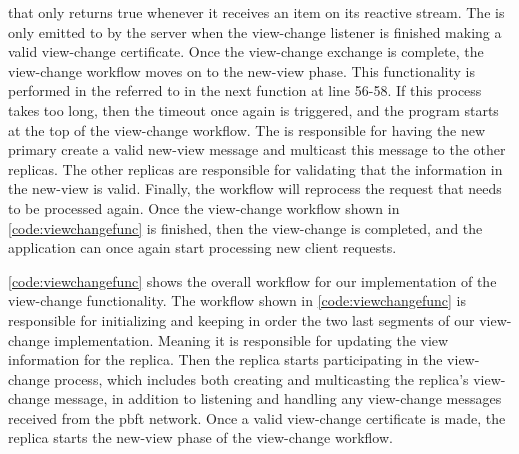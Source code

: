  that only returns true whenever it receives an item on its reactive stream. The  is only emitted to by the server when the view-change listener is finished making a valid view-change certificate. Once the view-change exchange is complete, the view-change workflow moves on to the new-view phase. This functionality is performed in the  referred to in the next  function at line 56-58. If this process takes too long, then the timeout once again is triggered, and the program starts at the top of the view-change workflow. The  is responsible for having the new primary create a valid new-view message and multicast this message to the other replicas. The other replicas are responsible for validating that the information in the new-view is valid. Finally, the workflow will reprocess the request that needs to be processed again. Once the view-change workflow shown in \autoref{code:viewchangefunc} is finished, then the view-change is completed, and the application can once again start processing new client requests.

\iffalse
\autoref{code:viewchangefunc} shows the overall workflow for our implementation of the view-change functionality.  The workflow shown in \autoref{code:viewchangefunc} is responsible for initializing and keeping in order the two last segments of our view-change implementation.  Meaning it is responsible for updating the view information for the replica. Then the replica starts participating in the view-change process, which includes both creating and multicasting the replica's view-change message, in addition to listening and handling any view-change messages received from the \ac{pbft} network. Once a valid view-change certificate is made, the replica starts the new-view phase of the view-change workflow. 

